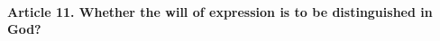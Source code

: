 \documentclass{ucetd}
\begin{document}
\paragraph{Article 11. Whether the will of expression is to be distinguished in God?}
\end{document}
